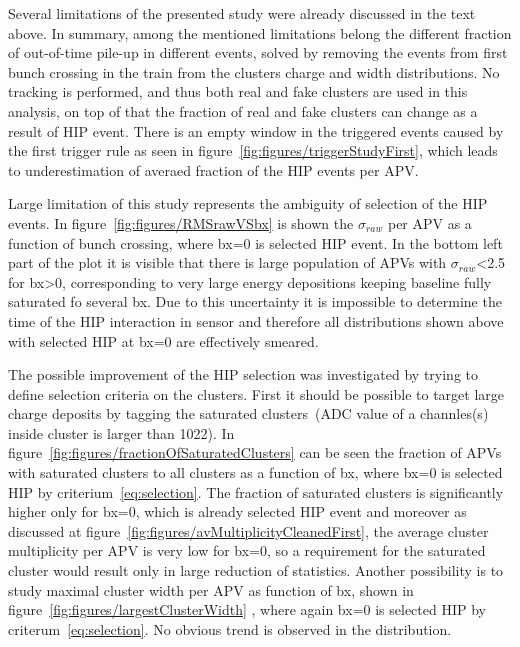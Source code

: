 Several limitations of the presented study were already discussed in the text above. In summary, among the mentioned limitations belong the different fraction of out-of-time pile-up in different events, solved by removing the events from first bunch crossing in the train from the clusters charge and width distributions. No tracking is performed, and thus both real and fake clusters are used in this analysis, on top of that the fraction of real and fake clusters can change as a result of HIP event. There is an empty window in the triggered events caused by the first trigger rule as seen in figure~\ref{fig:figures/triggerStudyFirst}, which leads to underestimation of averaed fraction of the HIP events per APV.


Large limitation of this study represents the ambiguity of selection of the HIP events. In figure~\ref{fig:figures/RMSrawVSbx} is shown the $\sigma_{raw}$ per APV as a function of bunch crossing, where bx=0 is selected HIP event. In the bottom left part of the plot it is visible that there is large population of APVs with $\sigma_{raw}$<2.5 for bx>0, corresponding to very large energy depositions keeping baseline fully saturated fo several bx. Due to this uncertainty it is impossible to determine the time of the HIP interaction in sensor and therefore all distributions shown above with selected HIP at bx=0 are effectively smeared. 


The possible improvement of the HIP selection was investigated by trying to define selection criteria on the clusters. First it should be possible to target large charge deposits by tagging the saturated clusters~(ADC value of a channles(s) inside cluster is larger than 1022). In figure~\ref{fig:figures/fractionOfSaturatedClusters} can be seen the fraction of APVs with saturated clusters to all clusters as a function of bx, where bx=0 is selected HIP by criterium~\ref{eq:selection}. The fraction of saturated clusters is significantly higher only for bx=0, which is already selected HIP event and moreover as discussed at figure~\ref{fig:figures/avMultiplicityCleanedFirst}, the average cluster multiplicity per APV is very low for bx=0, so a requirement for the saturated cluster would result only in large reduction of statistics. Another possibility is to study maximal cluster width per APV as function of bx, shown in figure~\ref{fig:figures/largestClusterWidth} , where again bx=0 is selected HIP by criterum~\ref{eq:selection}. No obvious trend is observed in the distribution. 

